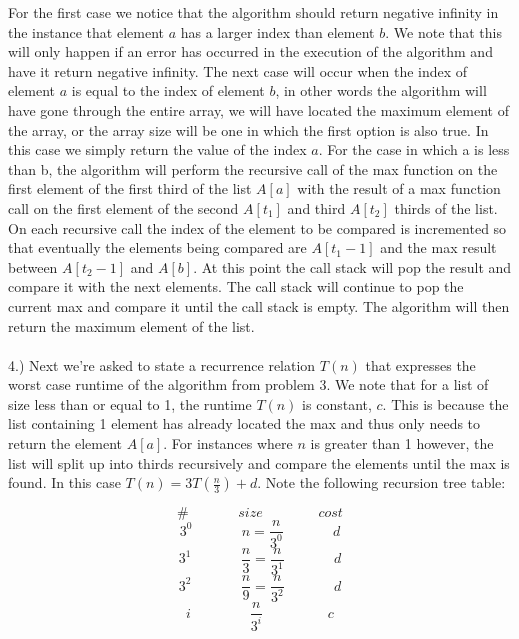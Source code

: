 \documentclass[paper=a4, 11pt]{scrartcl}
\begin{document}
For the first case we notice that the algorithm should return negative infinity in the instance that element $a$ has a larger index than element $b$. We note that this will only happen if an error has occurred in the execution of the algorithm and have it return negative infinity. The next case will occur when the index of element $a$ is equal to the index of element $b$, in other words the algorithm will have gone through the entire array, we will have located the maximum element of the array, or the array size will be one in which the first option is also true. In this case we simply return the value of the index $a$. For the case in which a is less than b, the algorithm will perform the recursive call of the max function on the first element of the first third of the list $A[a]$ with the result of a max function call on the first element of the second $A[t_1]$ and third $A[t_2]$ thirds of the list. On each recursive call the index of the element to be compared is incremented so that eventually the elements being compared are $A[t_1-1]$ and the max result between $A[t_2-1]$ and $A[b]$. At this point the call stack will pop the result and compare it with the next elements. The call stack will continue to pop the current max and compare it until the call stack is empty. The algorithm will then return the maximum element of the list.\\ \\
4.) Next we're asked to state a recurrence relation $T(n)$ that expresses the worst case runtime of the algorithm from problem 3. We note that for a list of size less than or equal to 1, the runtime $T(n)$ is constant, $c$. This is because the list containing 1 element has already located the max and thus only needs to return the element $A[a]$. For instances where $n$ is greater than 1 however, the list will split up into thirds recursively and compare the elements until the max is found. In this case $T(n)=3T(\frac{n}{3})+d$. Note the following recursion tree table:

$$\#\ \ \ \ \ \ \ \ \ \ \ \ \ \ \ \ size\ \ \ \ \ \ \ \ \ \ \ \ \ \ \ \ \ \ cost$$ 
$$3^0\ \ \ \ \ \ \ \ \ \ \ \ \ \ \ \ n=\frac{n}{3^0}\ \ \ \ \ \ \ \ \ \ \ \ \ \ \ \ d$$
$$3^1\ \ \ \ \ \ \ \ \ \ \ \ \ \ \ \ \frac{n}{3}=\frac{n}{3^1}\ \ \ \ \ \ \ \ \ \ \ \ \ \ \ \ d$$
$$3^2\ \ \ \ \ \ \ \ \ \ \ \ \ \ \ \ \frac{n}{9}=\frac{n}{3^2}\ \ \ \ \ \ \ \ \ \ \ \ \ \ \ \ d$$
$$i\ \ \ \ \ \ \ \ \ \ \ \ \ \ \ \ \ \ \ \frac{n}{3^i}\ \ \ \ \ \ \ \ \ \ \ \ \ \ \ \ \ \ \ \ \ c$$
\end{document}
